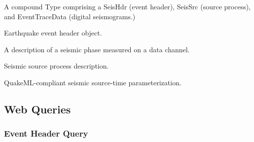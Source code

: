 \documentclass[letterpaper,11pt,english]{sphinxmanual}
\begin{document}
A compound Type comprising a SeisHdr (event header), SeisSrc (source process),
and EventTraceData (digital seismograms.)

\begin{fulllineitems}
\label{\detokenize{src/Submodules/quake:SeisHdr}}
\end{fulllineitems}


Earthquake event header object.

\begin{fulllineitems}
\label{\detokenize{src/Submodules/quake:SeisPha}}
\end{fulllineitems}


A description of a seismic phase measured on a data channel.

\begin{fulllineitems}
\label{\detokenize{src/Submodules/quake:SeisSrc}}
\end{fulllineitems}


Seismic source process description.

\begin{fulllineitems}
\label{\detokenize{src/Submodules/quake:SourceTime}}
\end{fulllineitems}


QuakeML-compliant seismic source-time parameterization.


\subsection{Web Queries}
\label{\detokenize{src/Submodules/quake:web-queries}}

\subsubsection{Event Header Query}
\label{\detokenize{src/Submodules/quake:event-header-query}}
\end{document}
